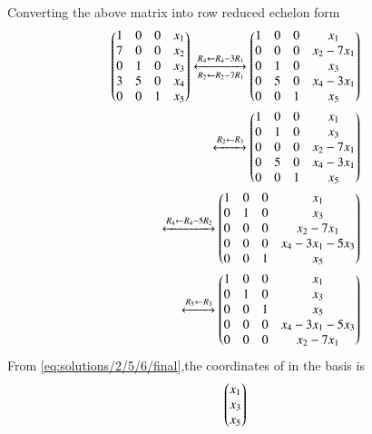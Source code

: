 \begin{enumerate}[label=\alph*.]
\begin{align}
\end{align}
Converting the above matrix into row reduced echelon form
\begin{align}
\begin{pmatrix}1&0&0&x_1\\7&0&0&x_2\\0&1&0&x_3\\3&5&0&x_4\\0&0&1&x_5\end{pmatrix}
\xleftrightarrow[R_2\leftarrow R_2-7R_1]{R_4\leftarrow R_4-3R_1}
\begin{pmatrix}1&0&0&x_1\\0&0&0&x_2-7x_1\\0&1&0&x_3\\0&5&0&x_4-3x_1\\0&0&1&x_5\end{pmatrix}\nonumber\\
\xleftrightarrow[]{R_2\leftarrow R_3}
\begin{pmatrix}1&0&0&x_1\\0&1&0&x_3\\0&0&0&x_2-7x_1\\0&5&0&x_4-3x_1\\0&0&1&x_5\end{pmatrix}\nonumber\\\xleftrightarrow[]{R_4\leftarrow R_4-5R_2}
\begin{pmatrix}1&0&0&x_1\\0&1&0&x_3\\0&0&0&x_2-7x_1\\0&0&0&x_4-3x_1-5x_3\\0&0&1&x_5\end{pmatrix}\nonumber\\\xleftrightarrow[]{R_5\leftarrow R_3}
\begin{pmatrix}1&0&0&x_1\\0&1&0&x_3\\0&0&1&x_5\\0&0&0&x_4-3x_1-5x_3\\0&0&0&x_2-7x_1\end{pmatrix}\label{eq:solutions/2/5/6/final}
\end{align}
From \eqref{eq:solutions/2/5/6/final},the coordinates of  in the  basis is
\begin{align}
    \begin{pmatrix}x_1\\x_3\\x_5\end{pmatrix}
\end{align}
\end{enumerate}
